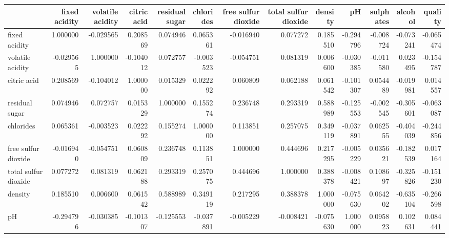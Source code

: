 \begin{tabular}{lrrrrrrrrrrrr}
\toprule
{} &  fixed acidity &  volatile acidity &  citric acid &  residual sugar &  chlorides &  free sulfur dioxide &  total sulfur dioxide &   density &        pH &  sulphates &   alcohol &   quality \\
\midrule
fixed acidity        &       1.000000 &         -0.029565 &     0.208569 &        0.074946 &   0.065361 &            -0.016940 &              0.077272 &  0.185510 & -0.294796 &  -0.008724 & -0.073241 & -0.065474 \\
volatile acidity     &      -0.029565 &          1.000000 &    -0.104012 &        0.072757 &  -0.003523 &            -0.054751 &              0.081319 &  0.006600 & -0.030385 &  -0.011580 &  0.023495 & -0.154787 \\
citric acid          &       0.208569 &         -0.104012 &     1.000000 &        0.015329 &   0.022292 &             0.060809 &              0.062188 &  0.061542 & -0.101307 &   0.054489 & -0.019981 &  0.014557 \\
residual sugar       &       0.074946 &          0.072757 &     0.015329 &        1.000000 &   0.155274 &             0.236748 &              0.293319 &  0.588989 & -0.125553 &  -0.002545 & -0.305601 & -0.063087 \\
chlorides            &       0.065361 &         -0.003523 &     0.022292 &        0.155274 &   1.000000 &             0.113851 &              0.257075 &  0.349119 & -0.037891 &   0.062555 & -0.404039 & -0.244856 \\
free sulfur dioxide  &      -0.016940 &         -0.054751 &     0.060809 &        0.236748 &   0.113851 &             1.000000 &              0.444696 &  0.217295 & -0.005229 &   0.035621 & -0.182539 &  0.017164 \\
total sulfur dioxide &       0.077272 &          0.081319 &     0.062188 &        0.293319 &   0.257075 &             0.444696 &              1.000000 &  0.388378 & -0.008421 &   0.108697 & -0.325826 & -0.151230 \\
density              &       0.185510 &          0.006600 &     0.061542 &        0.588989 &   0.349119 &             0.217295 &              0.388378 &  1.000000 & -0.075630 &   0.064202 & -0.635104 & -0.266598 \\
pH                   &      -0.294796 &         -0.030385 &    -0.101307 &       -0.125553 &  -0.037891 &            -0.005229 &             -0.008421 & -0.075630 &  1.000000 &   0.095823 &  0.102631 &  0.084441 \\

\end{tabular}
